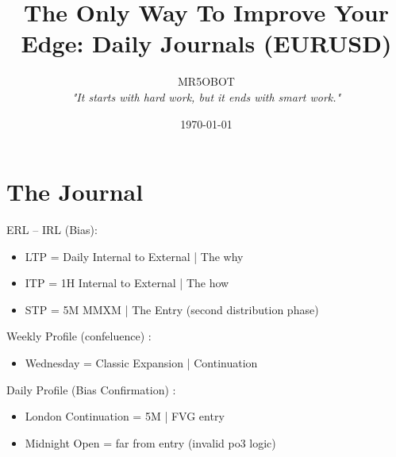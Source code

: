 \documentclass{article}
\title{The Only Way To Improve Your Edge: Daily Journals (EURUSD)}
\author{MR5OBOT \\ \textit{"It starts with hard work, but it ends with smart work."}}
\date{\today}
\begin{document}
\maketitle
\pagestyle{fancy}
\noindent\hdashrule[0.2ex]{\linewidth}{0.2pt}{1mm} 


\section{The Journal} 
\vspace{0.3cm}

\begin{enumerate}
\begin{notebox}
  \item ERL -- IRL (Bias): 
\end{notebox}

\begin{itemize} 
  \item LTP = \hspace{0.3pt} Daily Internal to External | The why \vspace{0.2cm}
  \item ITP = \hspace{0.3pt} 1H Internal to External | The how \vspace{0.2cm}
  \item STP = \hspace{0.3pt} 5M MMXM | The Entry (second distribution phase) \vspace{0.2cm}
\end{itemize}

\begin{notebox}
    \item Weekly Profile (confeluence)  : 
\end{notebox}

\begin{itemize} 
  \item Wednesday = \hspace{0.3pt} Classic Expansion | Continuation
\end{itemize}

\begin{notebox}
    \item Daily Profile (Bias Confirmation)  : 
\end{notebox}

\begin{itemize} 
  \item London Continuation = \hspace{0.3pt} 5M |  FVG entry
  \item Midnight Open = \hspace{0.3pt} far from entry (invalid po3 logic)

\end{itemize}
\end{enumerate}
\end{document}
